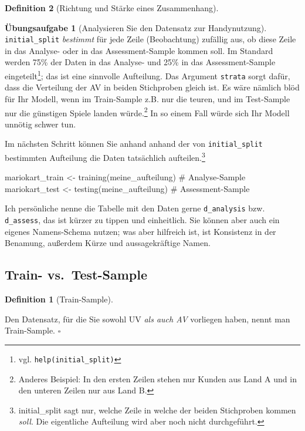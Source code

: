 \documentclass[
  a4paper,
  DIV=11]{scrreprt}
\newenvironment{Shaded}{\begin{snugshade}}{\end{snugshade}}
\newcommand{\CommentTok}[1]{\textcolor[rgb]{0.37,0.37,0.37}{#1}}
\newcommand{\FunctionTok}[1]{\textcolor[rgb]{0.28,0.35,0.67}{#1}}
\newcommand{\NormalTok}[1]{\textcolor[rgb]{0.00,0.23,0.31}{#1}}
\newcommand{\OtherTok}[1]{\textcolor[rgb]{0.00,0.23,0.31}{#1}}
\theoremstyle{definition}
\newtheorem{exercise}{Übungsaufgabe}[chapter]
\theoremstyle{definition}
\theoremstyle{definition}
\newtheorem{definition}{Definition}[chapter]
\theoremstyle{remark}
\begin{document}
\begin{definition}[Richtung und Stärke eines
Zusammenhang]
\begin{exercise}[Analysieren Sie den Datensatz zur
Handynutzung]
\texttt{initial\_split} \emph{bestimmt} für jede Zeile (Beobachtung)
zufällig aus, ob diese Zeile in das Analyse- oder in das
Assessment-Sample kommen soll. Im Standard werden 75\% der Daten in das
Analyse- und 25\% in das Assessment-Sample eingeteilt\footnote{vgl.
  \texttt{help(initial\_split)}}; das ist eine sinnvolle Aufteilung. Das
Argument \texttt{strata} sorgt dafür, dass die Verteilung der AV in
beiden Stichproben gleich ist. Es wäre nämlich blöd für Ihr Modell, wenn
im Train-Sample z.B. nur die teuren, und im Test-Sample nur die
günstigen Spiele landen würde.\footnote{Anderes Beispiel: In den ersten
  Zeilen stehen nur Kunden aus Land A und in den unteren Zeilen nur aus
  Land B.} In so einem Fall würde sich Ihr Modell unnötig schwer tun.

Im nächsten Schritt können Sie anhand anhand der von
\texttt{initial\_split} bestimmten Aufteilung die Daten tatsächlich
aufteilen.\footnote{initial\_split sagt nur, welche Zeile in welche der
  beiden Stichproben kommen \emph{soll}. Die eigentliche Aufteilung wird
  aber noch nicht durchgeführt.}

\begin{Shaded}
\begin{Highlighting}[]
\NormalTok{mariokart\_train }\OtherTok{\textless{}{-}} \FunctionTok{training}\NormalTok{(meine\_aufteilung)  }\CommentTok{\# Analyse{-}Sample}
\NormalTok{mariokart\_test }\OtherTok{\textless{}{-}} \FunctionTok{testing}\NormalTok{(meine\_aufteilung)  }\CommentTok{\# Assessment{-}Sample}
\end{Highlighting}
\end{Shaded}

Ich persönliche nenne die Tabelle mit den Daten gerne
\texttt{d\_analysis} bzw. \texttt{d\_assess}, das ist kürzer zu tippen
und einheitlich. Sie können aber auch ein eigenes Namens-Schema nutzen;
was aber hilfreich ist, ist Konsistenz in der Benamung, außerdem Kürze
und aussagekräftige Namen.

\subsection{Train- vs.~Test-Sample}\label{train--vs.-test-sample}

\begin{definition}[Train-Sample]\protect\hypertarget{def-trainsample}{}\label{def-trainsample}

Den Datensatz, für die Sie sowohl UV \emph{als auch AV} vorliegen haben,
nennt man Train-Sample. \(\square\)


\end{definition}
\end{exercise}
\end{definition}
\end{document}
